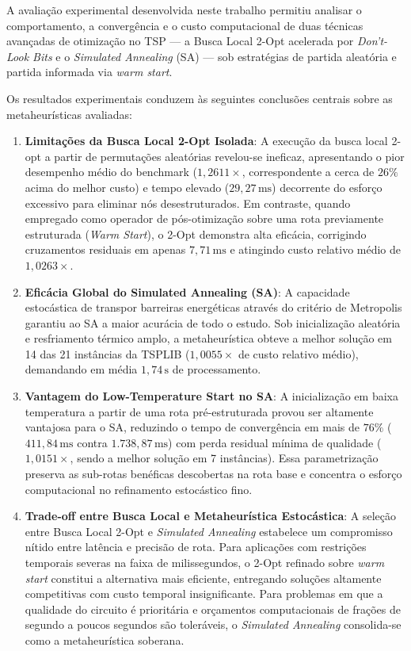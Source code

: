 \documentclass[12pt, a4paper]{article}
\begin{document}
A avaliação experimental desenvolvida neste trabalho permitiu analisar o comportamento, a convergência e o custo computacional de duas técnicas avançadas de otimização no TSP --- a Busca Local 2-Opt acelerada por \textit{Don't-Look Bits} e o \textit{Simulated Annealing} (SA) --- sob estratégias de partida aleatória e partida informada via \textit{warm start}.

Os resultados experimentais conduzem às seguintes conclusões centrais sobre as metaheurísticas avaliadas:

\begin{enumerate}
    \item \textbf{Limitações da Busca Local 2-Opt Isolada}: A execução da busca local 2-opt a partir de permutações aleatórias revelou-se ineficaz, apresentando o pior desempenho médio do benchmark ($1{,}2611\times$, correspondente a cerca de $26\%$ acima do melhor custo) e tempo elevado ($29{,}27\,\mathrm{ms}$) decorrente do esforço excessivo para eliminar nós desestruturados. Em contraste, quando empregado como operador de pós-otimização sobre uma rota previamente estruturada (\textit{Warm Start}), o 2-Opt demonstra alta eficácia, corrigindo cruzamentos residuais em apenas $7{,}71\,\mathrm{ms}$ e atingindo custo relativo médio de $1{,}0263\times$.

    \item \textbf{Eficácia Global do Simulated Annealing (SA)}: A capacidade estocástica de transpor barreiras energéticas através do critério de Metropolis garantiu ao SA a maior acurácia de todo o estudo. Sob inicialização aleatória e resfriamento térmico amplo, a metaheurística obteve a melhor solução em 14 das 21 instâncias da TSPLIB ($1{,}0055\times$ de custo relativo médio), demandando em média $1{,}74\,\mathrm{s}$ de processamento.

    \item \textbf{Vantagem do Low-Temperature Start no SA}: A inicialização em baixa temperatura a partir de uma rota pré-estruturada provou ser altamente vantajosa para o SA, reduzindo o tempo de convergência em mais de $76\%$ ($411{,}84\,\mathrm{ms}$ contra $1.738{,}87\,\mathrm{ms}$) com perda residual mínima de qualidade ($1{,}0151\times$, sendo a melhor solução em 7 instâncias). Essa parametrização preserva as sub-rotas benéficas descobertas na rota base e concentra o esforço computacional no refinamento estocástico fino.

    \item \textbf{Trade-off entre Busca Local e Metaheurística Estocástica}: A seleção entre Busca Local 2-Opt e \textit{Simulated Annealing} estabelece um compromisso nítido entre latência e precisão de rota. Para aplicações com restrições temporais severas na faixa de milissegundos, o 2-Opt refinado sobre \textit{warm start} constitui a alternativa mais eficiente, entregando soluções altamente competitivas com custo temporal insignificante. Para problemas em que a qualidade do circuito é prioritária e orçamentos computacionais de frações de segundo a poucos segundos são toleráveis, o \textit{Simulated Annealing} consolida-se como a metaheurística soberana.
\end{enumerate}



\end{document}
